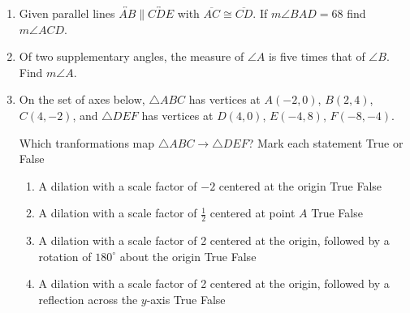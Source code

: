 \documentclass[12pt, twoside]{article}
\begin{document}
\begin{enumerate}
  \item Given parallel lines $\overleftrightarrow{AB} \parallel \overleftrightarrow{CDE}$ with $\overline{AC} \cong \overline{CD}$. If $m\angle BAD=68$ find $m\angle ACD$.
    \begin{flushright}
    \end{flushright} \vspace{1.5cm}

\newpage

  \item Of two supplementary angles, the measure of $\angle A$ is five times that of $\angle B$. Find $m\angle A$. \vspace{5cm} 


  \item On the set of axes below, $\triangle ABC$ has vertices at $A(-2,0)$, $B(2,4)$, $C(4,-2)$, and $\triangle DEF$ has vertices at $D(4,0)$, $E(-4,8)$, $F(-8,-4)$.
  \begin{center}
  \end{center}
  Which tranformations map $\triangle ABC \rightarrow \triangle DEF$? Mark each statement True or False
    \begin{enumerate}
      \item A dilation with a scale factor of $-2$ centered at the origin \hfill True \quad False
      \item A dilation with a scale factor of $\frac{1}{2}$ centered at point $A$ \hfill True \quad False
      \item A dilation with a scale factor of 2 centered at the origin, followed by a rotation of $180^\circ$ about the origin \hfill True \quad False
      \item A dilation with a scale factor of 2 centered at the origin, followed by a reflection across the $y$-axis \hfill True \quad False
    \end{enumerate}


\end{enumerate}
\end{document}
